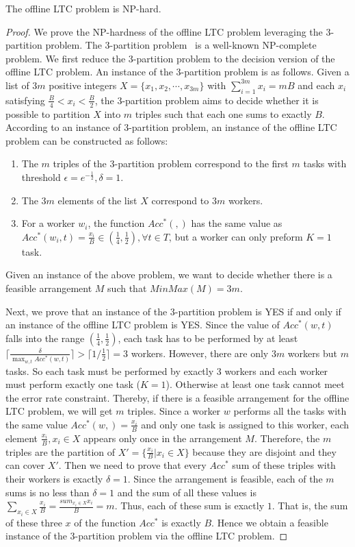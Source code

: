 \begin{theorem}
The offline LTC problem is NP-hard.
\end{theorem}
\begin{proof}
We prove the NP-hardness of the offline LTC problem leveraging the 3-partition problem.
The 3-partition problem~\cite{ThreePar} is a well-known NP-complete problem.
We first reduce the 3-partition problem to the decision version of the offline LTC problem.
An instance of the 3-partition problem is as follows.
Given a list of $3m$ positive integers $X = \{x_1, x_2, \cdots, x_{3m}\}$ with $\sum_{i=1}^{3m} x_i = mB$ and each $x_i$ satisfying $\frac{B}{4} < x_i < \frac{B}{2}$, the 3-partition problem aims to decide whether it is possible to partition $X$ into $m$ triples such that each one sums to exactly $B$.
According to an instance of 3-partition problem, an instance of the offline LTC problem can be constructed as follows:
\begin{enumerate}[(1)]
  \item The $m$ triples of the 3-partition problem correspond to the first $m$ tasks with threshold $\epsilon = e^{-\frac{1}{2}}, \delta = 1$.
  \item The $3m$ elements of the list $X$ correspond to $3m$ workers.
  \item For a worker $w_i$, the function $Acc^{*}(,)$ has the same value as $Acc^{*}(w_i, t) = \frac{x_i}{B} \in (\frac{1}{4}, \frac{1}{2}), \forall t \in T$, but a worker can only preform $K = 1$ task.
\end{enumerate}
Given an instance of the above problem, we want to decide whether there is a feasible arrangement $M$ such that $MinMax(M) = 3m$.

Next, we prove that an instance of the 3-partition problem is YES if and only if an instance of the offline LTC problem is YES.
Since the value of $Acc^{*}(w, t)$ falls into the range $(\frac{1}{4}, \frac{1}{2})$, each task has to be performed by at least $\lceil \frac{\delta}{\max_{w,t} Acc^{*}(w, t)} \rceil > \lceil 1/{\frac{1}{2}} \rceil = 3$ workers.
However, there are only $3m$ workers but $m$ tasks.
So each task must be performed by exactly 3 workers and each worker must perform exactly one task ($K = 1$).
Otherwise at least one task cannot meet the error rate constraint.
Thereby, if there is a feasible arrangement for the offline LTC problem, we will get $m$ triples.
Since a worker $w$ performs all the tasks with the same value $Acc^*(w,) = \frac{x_i}{B}$ and only one task is assigned to this worker, each element $\frac{x_i}{B}, x_i \in X$ appears only once in the arrangement $M$.
Therefore, the $m$ triples are the partition of $X' = \{\frac{x_i}{B} | x_i \in X\}$ because they are disjoint and they can cover $X'$.
Then we need to prove that every $Acc^{*}$ sum of these triples with their workers is exactly $\delta = 1$.
Since the arrangement is feasible, each of the $m$ sums is no less than $\delta = 1$ and the sum of all these values is $\sum_{x_i \in X} {\frac{x_i}{B}} = \frac{sum_{x_i \in X} x_i}{B} = m$.
Thus, each of these sum is exactly $1$.
That is, the sum of these three $x$ of the function $Acc^{*}$ is exactly $B$.
Hence we obtain a feasible instance of the 3-partition problem via the offline LTC problem.


\end{proof}
